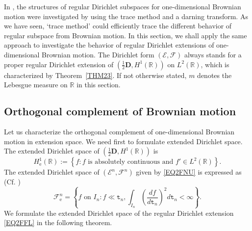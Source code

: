 \documentclass[a4paper]{amsart}
\theoremstyle{definition}
\theoremstyle{remark}
\numberwithin{equation}{section}
\begin{document}
In \cite{LY14}, the structures of regular Dirichlet subspaces for one-dimensional Brownian motion were investigated by using the trace method and a darning transform.
As we have seen, `trace method' could efficiently trace the different behavior of regular subspace from Brownian motion.
In this section, we shall apply the same approach to investigate the behavior of regular Dirichlet extensions of one-dimensional Brownian motion. The Dirichlet form $({{\mathcal{E}}},{{\mathcal{F}}})$ always stands for a proper regular Dirichlet extension of $(\frac{1}{2}\mathbf{D}, H^1(\mathbb{R}))$ on $L^2(\mathbb{R})$, which is characterized by Theorem~\ref{THM23}. If not otherwise stated, $m$ denotes the Lebesgue measure on $\mathbb{R}$ in this section.

\subsection{Orthogonal complement of Brownian motion}\label{SEC31}

Let us characterize the orthogonal complement of one-dimensional Brownian motion in extension space. We need first to formulate
extended Dirichlet space.
The extended Dirichlet space of $(\frac{1}{2}\mathbf{D}, H^1(\mathbb{R}))$ is
\[
	H^1_\mathrm{e}(\mathbb{R}):=\left\{f: f \text{ is absolutely continuous and }f'\in L^2(\mathbb{R})\right\}.
\]
The extended Dirichlet space of $({{\mathcal{E}}}^n,{{\mathcal{F}}}^n)$ given by \eqref{EQ2FNU} is expressed as (Cf. \cite[Theorem~2.2.11]{CF12})
\begin{equation}\label{EQ3FNE}
{{\mathcal{F}}}^n_\mathrm{e}=\left\{f\text{ on }I_n: f\ll {{\mathtt{t}}}_n, \int_{I_n}\left(\frac{df}{d{{\mathtt{t}}}_n}\right)^2d{{\mathtt{t}}}_n<\infty \right\}.
\end{equation}
We formulate the extended Dirichlet space of the regular Dirichlet extension \eqref{EQ2FFL} in the following theorem.
\end{document}
